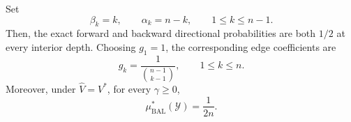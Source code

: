 \documentclass{article}
\numberwithin{theorem}{section}
\numberwithin{proposition}{section}
\numberwithin{corollary}{section}
\numberwithin{lemma}{section}
\numberwithin{conjecture}{section}
\numberwithin{remark}{section}
\numberwithin{definition}{section}
\numberwithin{assumption}{section}
\numberwithin{example}{section}
\newcommand{\calY}{{\mathcal{Y}}}
\begin{document}
\begin{corollary}
\label{cor:canonical_balanced_aoar}
Set
\begin{equation*}
    \beta_k=k, \qquad \alpha_k=n-k, \qquad 1\le k\le n-1.
\end{equation*}
Then, the exact forward and backward directional probabilities are both $1/2$ at every interior depth. Choosing $g_1=1$, the corresponding edge coefficients are
\begin{equation*}
    g_k = \frac{1}{\binom{n-1}{k-1}}, \qquad 1\le k\le n.
\end{equation*}
Moreover, under $\widehat V=V^*$, for every $\gamma\ge 0$,
\begin{equation*}
    \mu_{\mathrm{BAL}}^*(\calY) = \frac{1}{2n}.
\end{equation*}
\end{corollary}
\end{document}
